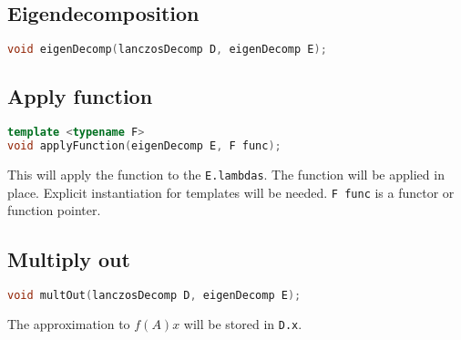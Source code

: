 \documentclass[a4paper, fleqn]{article}
\begin{document}
\subsection{Eigendecomposition}%
\label{sub:eig}

\begin{lstlisting}[language = C++]
void eigenDecomp(lanczosDecomp D, eigenDecomp E);
\end{lstlisting}

\subsection{Apply function}%
\label{sub:apply_function}
\begin{lstlisting}[language = C++]
template <typename F>
void applyFunction(eigenDecomp E, F func);
\end{lstlisting}
This will apply the function to the \texttt{E.lambdas}. The function will be applied in place. Explicit instantiation for templates will be needed. \texttt{F func} is a functor or function pointer.
\subsection{Multiply out}%
\label{sub:multiply_out}
\begin{lstlisting}[language = C++]
void multOut(lanczosDecomp D, eigenDecomp E);
\end{lstlisting}
The approximation to $f(A)x$ will be stored in  \texttt{D.x}. 
\end{document}
